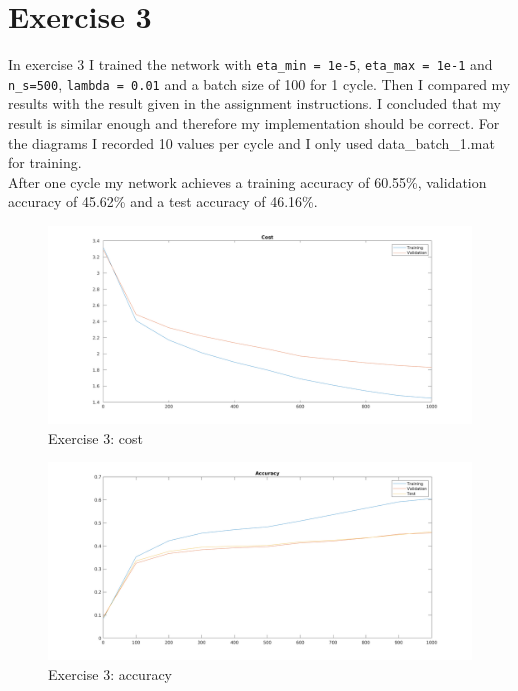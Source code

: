 \clearpage
\section{Exercise 3}
In exercise 3 I trained the network with  \texttt{eta\_min = 1e-5}, \texttt{eta\_max = 1e-1} and \texttt{n\_s=500}, 
\texttt{lambda = 0.01} and a batch size of 100 for 1 cycle.
Then I compared my results with the result given in the assignment instructions. I concluded that my result is similar enough and therefore 
my implementation should be correct. For the diagrams I recorded 10 values per cycle and I only used data\_batch\_1.mat for training.\\
After one cycle my network achieves a training accuracy of 60.55\%, validation accuracy of 45.62\% and a test accuracy of 46.16\%.

    \begin{figure}[ht]
        \includegraphics[width=\textwidth]{../code/result_pics/ex3_cost.png}
        \caption{Exercise 3: cost}
    \end{figure}
    \begin{figure}[ht]
        \includegraphics[width=\textwidth]{../code/result_pics/ex3_accuracy.png}
        \caption{Exercise 3: accuracy}
    \end{figure}

\clearpage

